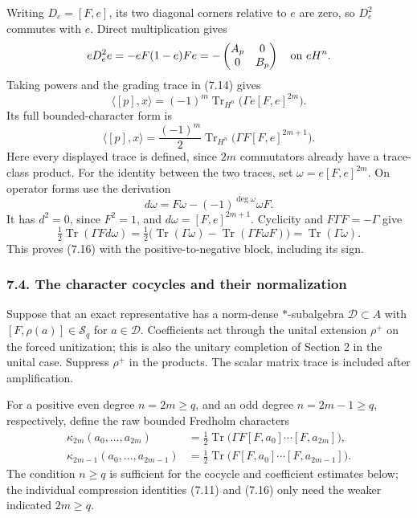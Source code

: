 \documentclass[
  11pt,
]{article}
\begin{document}
Writing \(D_e=[F,e]\), its two diagonal corners relative to \(e\) are
zero, so \(D_e^2\) commutes with \(e\). Direct multiplication gives \[
 eD_e^2e=-eF(1-e)Fe
         =-\begin{pmatrix}A_p&0\\0&B_p\end{pmatrix}
             \quad\hbox{on }eH^n.
\] Taking powers and the grading trace in (7.14) gives \[
 \langle[p],x\rangle
       =(-1)^m\operatorname{Tr}_{H^n}
                         \bigl(\Gamma e[F,e]^{2m}\bigr).
 \tag{7.15}
\] Its full bounded-character form is \[
 \boxed{\quad
 \langle[p],x\rangle
   =\frac{(-1)^m}{2}\operatorname{Tr}_{H^n}
                         \bigl(\Gamma F[F,e]^{2m+1}\bigr).
 \quad}
 \tag{7.16}
\] Here every displayed trace is defined, since \(2m\) commutators
already have a trace-class product. For the identity between the two
traces, set \(\omega=e[F,e]^{2m}\). On operator forms use the derivation
\[
 d\omega=F\omega-(-1)^{\deg\omega}\omega F .
 \tag{7.17}
\] It has \(d^2=0\), since \(F^2=1\), and \(d\omega=[F,e]^{2m+1}\).
Cyclicity and \(F\Gamma F=-\Gamma\) give \[
 \tfrac12\operatorname{Tr}(\Gamma Fd\omega)
   =\tfrac12\bigl(\operatorname{Tr}(\Gamma\omega)
                  -\operatorname{Tr}(\Gamma F\omega F)\bigr)
   =\operatorname{Tr}(\Gamma\omega).
\] This proves (7.16) with the positive-to-negative block, including its
sign.

\subsubsection{7.4. The character cocycles and their
normalization}\label{the-character-cocycles-and-their-normalization}

Suppose that an exact representative has a norm-dense \(*\)-subalgebra
\(\mathcal D\subset A\) with \([F,\rho(a)]\in\mathcal S_q\) for
\(a\in\mathcal D\). Coefficients act through the unital extension
\(\rho^+\) on the forced unitization; this is also the unitary
completion of Section 2 in the unital case. Suppress \(\rho^+\) in the
products. The scalar matrix trace is included after amplification.

For a positive even degree \(n=2m\geq q\), and an odd degree
\(n=2m-1\geq q\), respectively, define the raw bounded Fredholm
characters \[
\begin{split}
 \kappa_{2m}(a_0,\ldots,a_{2m})
  &=\tfrac12\operatorname{Tr}
             \bigl(\Gamma F[F,a_0]\cdots[F,a_{2m}]\bigr),\\
 \kappa_{2m-1}(a_0,\ldots,a_{2m-1})
  &=\tfrac12\operatorname{Tr}
             \bigl(F[F,a_0]\cdots[F,a_{2m-1}]\bigr).
\end{split}
 \tag{7.18}
\] The condition \(n\geq q\) is sufficient for the cocycle and
coefficient estimates below; the individual compression identities
(7.11) and (7.16) only need the weaker indicated \(2m\geq q\).
\end{document}
